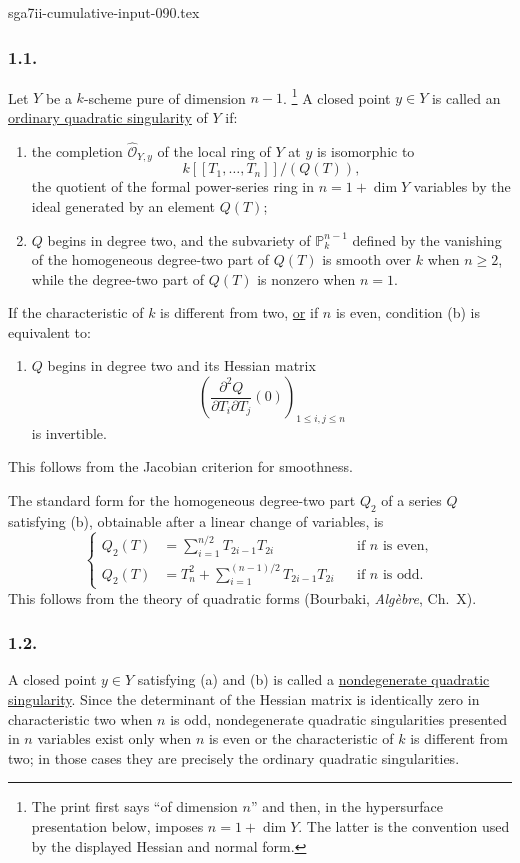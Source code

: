 \begin{filecontents*}{sga7ii-cumulative-input-090.tex}
\subsubsection*{1.1.}
Let $Y$ be a $k$-scheme pure of dimension $n-1$.
\footnote{The print first says ``of dimension $n$'' and then, in the
hypersurface presentation below, imposes $n=1+\dim Y$.  The latter is
the convention used by the displayed Hessian and normal form.}
A closed point $y\in Y$ is called an \underline{ordinary quadratic
singularity} of $Y$ if:
\begin{enumerate}
\item[(a)] the completion $\widehat{\mathcal O}_{Y,y}$ of the local
ring of $Y$ at $y$ is isomorphic to
\[
k[[T_1,\ldots,T_n]]/(Q(T)),
\]
the quotient of the formal power-series ring in
$n=1+\dim Y$ variables by the ideal generated by an element $Q(T)$;
\item[(b)] $Q$ begins in degree two, and the subvariety of
$\mathbb P^{n-1}_k$ defined by the vanishing of the homogeneous
degree-two part of $Q(T)$ is smooth over $k$ when $n\geq2$, while the
degree-two part of $Q(T)$ is nonzero when $n=1$.
\end{enumerate}

If the characteristic of $k$ is different from two, \underline{or} if
$n$ is even, condition (b) is equivalent to:
\begin{enumerate}
\item[(b$'$)] $Q$ begins in degree two and its Hessian matrix
\[
\left(
  \frac{\partial^2Q}{\partial T_i\partial T_j}(0)
\right)_{1\leq i,j\leq n}
\]
is invertible.
\end{enumerate}
This follows from the Jacobian criterion for smoothness.

The standard form for the homogeneous degree-two part $Q_2$ of a
series $Q$ satisfying (b), obtainable after a linear change of
variables, is
\begin{equation}\tag{1.1.1}
\left\{
\begin{aligned}
Q_2(T)&=\sum_{i=1}^{n/2}T_{2i-1}T_{2i}
  &&\text{if $n$ is even},\\[1ex]
Q_2(T)&=T_n^2+\sum_{i=1}^{(n-1)/2}T_{2i-1}T_{2i}
  &&\text{if $n$ is odd}.
\end{aligned}
\right.
\end{equation}
This follows from the theory of quadratic forms (Bourbaki,
\emph{Alg\`ebre}, Ch.~X).

\subsubsection*{1.2.}
A closed point $y\in Y$ satisfying (a) and (b) is called a
\underline{nondegenerate quadratic singularity}.  Since the
determinant of the Hessian matrix is identically zero in
characteristic two when $n$ is odd, nondegenerate quadratic
singularities presented in $n$ variables exist only when $n$ is even
or the characteristic of $k$ is different from two; in those cases
they are precisely the ordinary quadratic singularities.
\end{filecontents*}
